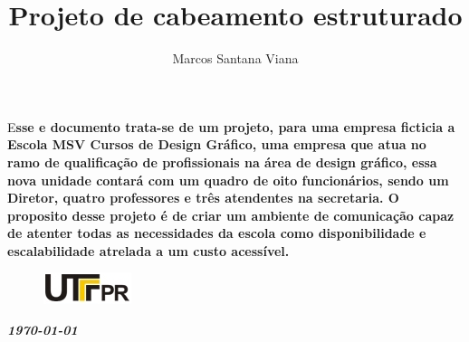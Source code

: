 \documentclass[	DIV=calc,%
							paper=a4,%
							fontsize=12pt,%
							onecolumn]{scrartcl}	 					%
\title{Projeto de cabeamento estruturado}					%
\author{Marcos Santana Viana}  	%
\date{}																				%
\newcommand{\initial}[1]{%
     \lettrine[lines=3,lhang=0.3,nindent=0em]{
     				\color{DarkGoldenrod}
     				{\textsf{#1}}}{}}
\begin{document}
\maketitle
\thispagestyle{fancy} 	
\thispagestyle{empty}		%

\initial{E}\textbf{sse e documento trata-se de um projeto, para uma empresa ficticia a Escola MSV Cursos de Design Gráfico, uma empresa que atua no ramo de qualificação de profissionais na área de design gráfico, essa nova unidade contará com um quadro de oito funcionários, sendo um Diretor, quatro professores e três atendentes na secretaria.
	O proposito desse projeto é de criar um ambiente de comunicação capaz de atenter todas as necessidades da escola como disponibilidade e escalabilidade atrelada a um custo acessível.}


\begin{figure}
	\centering
	\includegraphics{utfpr}
\end{figure}

\vspace{3cm}
\centerline{\textit{\textbf{\today}}}

\clearpage
    \renewcommand*\listfigurename{Lista de figuras}
\listoffigures





\clearpage
\renewcommand{\contentsname}{Sumário}
\tableofcontents
\clearpage

\end{document}

